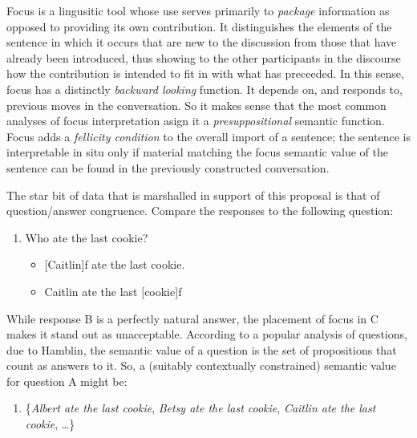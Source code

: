 \documentclass[letterpaper,]{article}
\begin{document}

Focus is a lingusitic tool whose use serves primarily to \emph{package}
information as opposed to providing its own contribution. It
distinguishes the elements of the sentence in which it occurs that are
new to the discussion from those that have already been introduced, thus
showing to the other participants in the discourse how the contribution
is intended to fit in with what has preceeded. In this sense, focus has
a distinctly \emph{backward looking} function. It depends on, and
responds to, previous moves in the conversation. So it makes sense that
the most common analyses of focus interpretation asign it a
\emph{presuppositional} semantic function. Focus adds a \emph{fellicity
condition} to the overall import of a sentence; the sentence is
interpretable in situ only if material matching the focus semantic value
of the sentence can be found in the previously constructed conversation.

The star bit of data that is marshalled in support of this proposal is
that of question/answer congruence. Compare the responses to the
following question:

\begin{enumerate}
\def\labelenumi{(\arabic{enumi})}
\itemsep1pt\parskip0pt
\item
  Who ate the last cookie?

  \begin{itemize}
  \itemsep1pt\parskip0pt
  \item
    {[}Caitlin{]}f ate the last cookie.
  \item
    Caitlin ate the last {[}cookie{]}f
  \end{itemize}
\end{enumerate}

While response B is a perfectly natural answer, the placement of focus
in C makes it stand out as unacceptable. According to a popular analysis
of questions, due to Hamblin, the semantic value of a question is the
set of propositions that count as answers to it. So, a (suitably
contextually constrained) semantic value for question A might be:

\begin{enumerate}
\def\labelenumi{(\arabic{enumi})}
\setcounter{enumi}{1}
\itemsep1pt\parskip0pt
\item
  \{\emph{Albert ate the last cookie}, \emph{Betsy ate the last cookie},
  \emph{Caitlin ate the last cookie}, \ldots{}\}
\end{enumerate}
\end{document}
